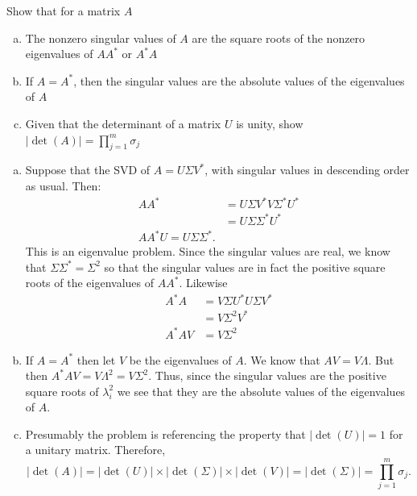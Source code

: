 \documentclass[letter, 12pt]{article}
\begin{document}
\pagebreak

\begin{problem}
Show that for a matrix $A$
\begin{enumerate}[(a)]
\item The nonzero singular values of $A$ are the square roots of the nonzero eigenvalues of $AA^*$ or $A^*A$
\item If $A=A^*$, then the singular values are the absolute values of the eigenvalues of $A$
\item Given that the determinant of a matrix $U$ is unity, show $|\det(A)|=\prod_{j=1}^m \sigma_j$
\end{enumerate}
\end{problem}

\begin{enumerate}[(a)]
\item Suppose that the SVD of $A = U\Sigma V^*$, with singular values in descending order as usual. Then:
\begin{align*}
AA^* & = U\Sigma V^* V \Sigma^* U^* \\
& = U\Sigma\Sigma^* U^* \\
AA^* U = U \Sigma\Sigma^*.
\end{align*}
This is an eigenvalue problem. Since the singular values are real, we know that $\Sigma\Sigma^* = \Sigma^2$ so that the singular values are in fact the positive square roots of the eigenvalues of $AA^*$. Likewise
\begin{align*}
A^*A & = V\Sigma U^*U\Sigma V^* \\
& = V\Sigma^2V^* \\
A^*A V & = V\Sigma^2
\end{align*}
\item If $A=A^*$ then let $V$ be the eigenvalues of $A$. We know that $AV = V \Lambda$. But then $A^*AV = V \Lambda^2 = V\Sigma^2$. Thus, since the singular values are the positive square roots of $\lambda_i^2$ we see that they are the absolute values of the eigenvalues of $A$.
\item Presumably the problem is referencing the property that $|\det(U)| = 1$ for a unitary matrix. Therefore, \[|\det(A)| = |\det(U)|\times |\det(\Sigma)| \times |\det(V)| = |\det(\Sigma)| = \prod_{j=1}^m \sigma_j.\]
\end{enumerate}

\pagebreak
\end{document}
